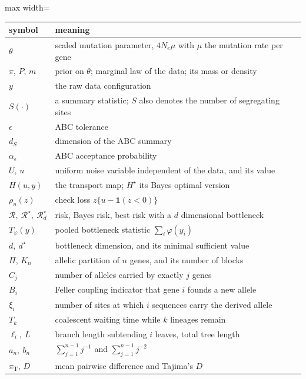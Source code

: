 \begin{center}
\begin{adjustbox}{max width=\textwidth}
\begin{tabular}{ll}
\toprule
symbol & meaning \\
\midrule
$\theta$ & scaled mutation parameter, $4N_e\mu$ with $\mu$ the mutation rate per gene \\
$\pi$, $P$, $m$ & prior on $\theta$; marginal law of the data; its mass or density \\
$y$ & the raw data configuration \\
$S(\cdot)$ & a summary statistic; $S$ also denotes the number of segregating sites \\
$\epsilon$ & ABC tolerance \\
$d_S$ & dimension of the ABC summary \\
$\alpha_\epsilon$ & ABC acceptance probability \\
$U$, $u$ & uniform noise variable independent of the data, and its value \\
$H(u,y)$ & the transport map; $H^\star$ its Bayes optimal version \\
$\rho_u(z)$ & check loss $z\{u-\mathbf 1(z<0)\}$ \\
$\mathcal{R},\ \mathcal{R}^\star,\ \mathcal{R}^\star_d$ & risk, Bayes risk, best risk with a $d$ dimensional bottleneck \\
$T_\varphi(y)$ & pooled bottleneck statistic $\sum_i\varphi(y_i)$ \\
$d,\ d^\star$ & bottleneck dimension, and its minimal sufficient value \\
$\Pi$, $K_n$ & allelic partition of $n$ genes, and its number of blocks \\
$C_j$ & number of alleles carried by exactly $j$ genes \\
$B_i$ & Feller coupling indicator that gene $i$ founds a new allele \\
$\xi_i$ & number of sites at which $i$ sequences carry the derived allele \\
$T_k$ & coalescent waiting time while $k$ lineages remain \\
$\ell_i,\ L$ & branch length subtending $i$ leaves, total tree length \\
$a_n,\ b_n$ & $\sum_{j=1}^{n-1}j^{-1}$ and $\sum_{j=1}^{n-1}j^{-2}$ \\
$\pi_{\mathrm{T}}$, $D$ & mean pairwise difference and Tajima's $D$ \\
\bottomrule
\end{tabular}
\end{adjustbox}
\end{center}


